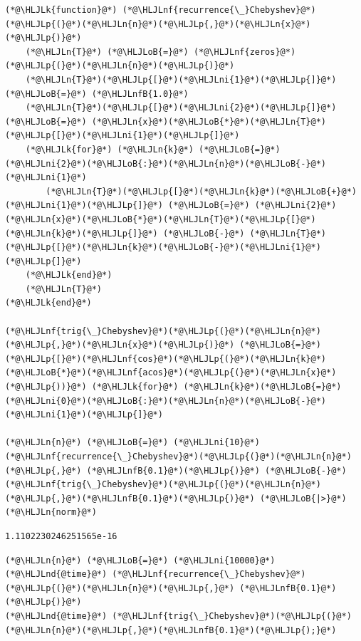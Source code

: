 \documentclass[12pt,a4paper]{article}
\newcommand{\HLJLk}[1]{\textcolor[RGB]{148,91,176}{\textbf{#1}}}
\newcommand{\HLJLn}[1]{#1}
\newcommand{\HLJLnd}[1]{\textcolor[RGB]{214,102,97}{#1}}
\newcommand{\HLJLnf}[1]{\textcolor[RGB]{66,102,213}{#1}}
\newcommand{\HLJLnfB}[1]{\textcolor[RGB]{59,151,46}{#1}}
\newcommand{\HLJLni}[1]{\textcolor[RGB]{59,151,46}{#1}}
\newcommand{\HLJLoB}[1]{\textcolor[RGB]{102,102,102}{\textbf{#1}}}
\newcommand{\HLJLp}[1]{#1}
\begin{document}
\begin{lstlisting}
(*@\HLJLk{function}@*) (*@\HLJLnf{recurrence{\_}Chebyshev}@*)(*@\HLJLp{(}@*)(*@\HLJLn{n}@*)(*@\HLJLp{,}@*)(*@\HLJLn{x}@*)(*@\HLJLp{)}@*)
    (*@\HLJLn{T}@*) (*@\HLJLoB{=}@*) (*@\HLJLnf{zeros}@*)(*@\HLJLp{(}@*)(*@\HLJLn{n}@*)(*@\HLJLp{)}@*)
    (*@\HLJLn{T}@*)(*@\HLJLp{[}@*)(*@\HLJLni{1}@*)(*@\HLJLp{]}@*) (*@\HLJLoB{=}@*) (*@\HLJLnfB{1.0}@*)
    (*@\HLJLn{T}@*)(*@\HLJLp{[}@*)(*@\HLJLni{2}@*)(*@\HLJLp{]}@*) (*@\HLJLoB{=}@*) (*@\HLJLn{x}@*)(*@\HLJLoB{*}@*)(*@\HLJLn{T}@*)(*@\HLJLp{[}@*)(*@\HLJLni{1}@*)(*@\HLJLp{]}@*)
    (*@\HLJLk{for}@*) (*@\HLJLn{k}@*) (*@\HLJLoB{=}@*) (*@\HLJLni{2}@*)(*@\HLJLoB{:}@*)(*@\HLJLn{n}@*)(*@\HLJLoB{-}@*)(*@\HLJLni{1}@*)
        (*@\HLJLn{T}@*)(*@\HLJLp{[}@*)(*@\HLJLn{k}@*)(*@\HLJLoB{+}@*)(*@\HLJLni{1}@*)(*@\HLJLp{]}@*) (*@\HLJLoB{=}@*) (*@\HLJLni{2}@*)(*@\HLJLn{x}@*)(*@\HLJLoB{*}@*)(*@\HLJLn{T}@*)(*@\HLJLp{[}@*)(*@\HLJLn{k}@*)(*@\HLJLp{]}@*) (*@\HLJLoB{-}@*) (*@\HLJLn{T}@*)(*@\HLJLp{[}@*)(*@\HLJLn{k}@*)(*@\HLJLoB{-}@*)(*@\HLJLni{1}@*)(*@\HLJLp{]}@*)
    (*@\HLJLk{end}@*)
    (*@\HLJLn{T}@*)
(*@\HLJLk{end}@*)

(*@\HLJLnf{trig{\_}Chebyshev}@*)(*@\HLJLp{(}@*)(*@\HLJLn{n}@*)(*@\HLJLp{,}@*)(*@\HLJLn{x}@*)(*@\HLJLp{)}@*) (*@\HLJLoB{=}@*) (*@\HLJLp{[}@*)(*@\HLJLnf{cos}@*)(*@\HLJLp{(}@*)(*@\HLJLn{k}@*)(*@\HLJLoB{*}@*)(*@\HLJLnf{acos}@*)(*@\HLJLp{(}@*)(*@\HLJLn{x}@*)(*@\HLJLp{))}@*) (*@\HLJLk{for}@*) (*@\HLJLn{k}@*)(*@\HLJLoB{=}@*)(*@\HLJLni{0}@*)(*@\HLJLoB{:}@*)(*@\HLJLn{n}@*)(*@\HLJLoB{-}@*)(*@\HLJLni{1}@*)(*@\HLJLp{]}@*)

(*@\HLJLn{n}@*) (*@\HLJLoB{=}@*) (*@\HLJLni{10}@*)
(*@\HLJLnf{recurrence{\_}Chebyshev}@*)(*@\HLJLp{(}@*)(*@\HLJLn{n}@*)(*@\HLJLp{,}@*) (*@\HLJLnfB{0.1}@*)(*@\HLJLp{)}@*) (*@\HLJLoB{-}@*) (*@\HLJLnf{trig{\_}Chebyshev}@*)(*@\HLJLp{(}@*)(*@\HLJLn{n}@*)(*@\HLJLp{,}@*)(*@\HLJLnfB{0.1}@*)(*@\HLJLp{)}@*) (*@\HLJLoB{|>}@*)(*@\HLJLn{norm}@*)
\end{lstlisting}

\begin{lstlisting}
1.1102230246251565e-16
\end{lstlisting}


\begin{lstlisting}
(*@\HLJLn{n}@*) (*@\HLJLoB{=}@*) (*@\HLJLni{10000}@*)
(*@\HLJLnd{@time}@*) (*@\HLJLnf{recurrence{\_}Chebyshev}@*)(*@\HLJLp{(}@*)(*@\HLJLn{n}@*)(*@\HLJLp{,}@*) (*@\HLJLnfB{0.1}@*)(*@\HLJLp{)}@*)
(*@\HLJLnd{@time}@*) (*@\HLJLnf{trig{\_}Chebyshev}@*)(*@\HLJLp{(}@*)(*@\HLJLn{n}@*)(*@\HLJLp{,}@*)(*@\HLJLnfB{0.1}@*)(*@\HLJLp{);}@*)
\end{lstlisting}
\end{document}
